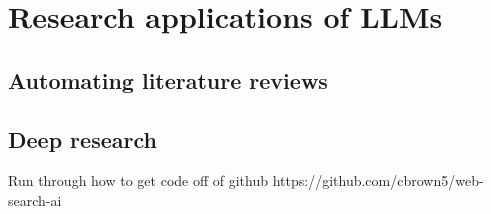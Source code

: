 \documentclass[
  letterpaper,
  DIV=11,
  numbers=noendperiod]{scrreprt}
\begin{document}
\chapter{Research applications of
LLMs}\label{research-applications-of-llms}

\section{Automating literature
reviews}\label{automating-literature-reviews}

\section{Deep research}\label{sec-deepresearch}

Run through how to get code off of github
https://github.com/cbrown5/web-search-ai
\end{document}
